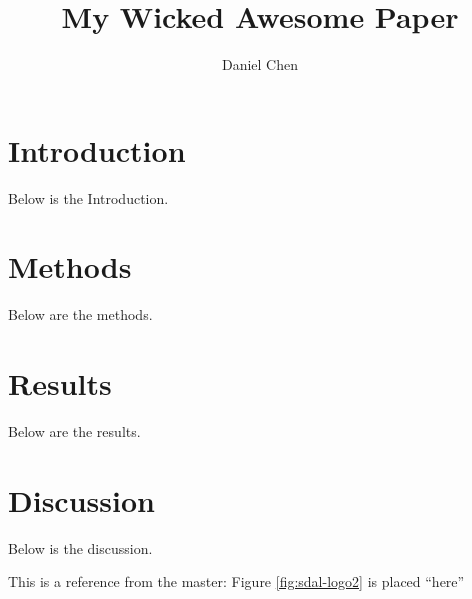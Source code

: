 \documentclass[10pt,letterpaper,twocolumn]{article}
\author{Daniel Chen}
\title{My Wicked Awesome Paper}
\begin{document}
\maketitle

\section{Introduction}

Below is the Introduction.



\section{Methods}

Below are the methods.




\section{Results}

Below are the results.




\section{Discussion}

Below is the discussion.

This is a reference from the master:  Figure \ref{fig:sdal-logo2} is placed ``here''


\end{document}
